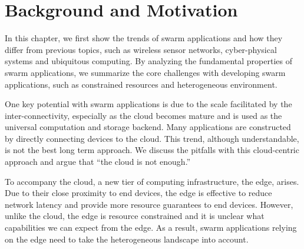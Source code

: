 \documentclass[thesis.tex]{subfiles}
\begin{document}
\chapter{Background and Motivation}
\label{cha:background}

In this chapter, we first show the trends of swarm applications and how they
differ from previous topics, such as wireless sensor networks, cyber-physical
systems and ubiquitous computing. By analyzing the fundamental properties of
swarm applications, we summarize the core challenges with developing swarm
applications, such as constrained resources and heterogeneous environment.

One key potential with swarm applications is due to the scale facilitated by the
inter-connectivity, especially as the cloud becomes mature and is used as the
universal computation and storage backend. Many applications are constructed by
directly connecting devices to the cloud. This trend, although understandable,
is not the best long term approach. We discuss the pitfalls with this
cloud-centric approach and argue that ``the cloud is not enough.''

To accompany the cloud, a new tier of computing infrastructure, the edge,
arises. Due to their close proximity to end devices, the edge is effective to
reduce network latency and provide more resource guarantees to end
devices. However, unlike the cloud, the edge is resource constrained and it is
unclear what capabilities we can expect from the edge. As a result, swarm
applications relying on the edge need to take the heterogeneous landscape into
account.





\end{document}
